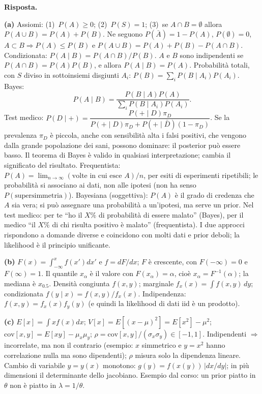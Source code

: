 \documentclass[11pt,a4paper]{article}
\newcommand{\Ris}[1]{\noindent\textbf{Risposta.}\par\nopagebreak #1}
\begin{document}
\Ris{
\textbf{(a)} Assiomi: (1)~$P(A)\ge0$; (2)~$P(S)=1$; (3)~se $A\cap B=\emptyset$ allora $P(A\cup B)=P(A)+P(B)$. Ne seguono $P(\bar A)=1-P(A)$, $P(\emptyset)=0$, $A\subset B\Rightarrow P(A)\le P(B)$ e $P(A\cup B)=P(A)+P(B)-P(A\cap B)$.
Condizionata: $P(A\mid B)=P(A\cap B)/P(B)$. $A$ e $B$ sono indipendenti se $P(A\cap B)=P(A)P(B)$, e allora $P(A\mid B)=P(A)$.
Probabilit\`a totali, con $S$ diviso in sottoinsiemi disgiunti $A_i$: $P(B)=\sum_i P(B\mid A_i)P(A_i)$. Bayes:
\[
P(A\mid B)=\frac{P(B\mid A)P(A)}{\sum_i P(B\mid A_i)P(A_i)} .
\]
Test medico: $P(D\mid +)=\dfrac{P(+\mid D)\pi_D}{P(+\mid D)\pi_D+P(+\mid\bar D)(1-\pi_D)}$. Se la prevalenza $\pi_D$ \`e piccola, anche con sensibilit\`a alta i falsi positivi, che vengono dalla grande popolazione dei sani, possono dominare: il posterior pu\`o essere basso.
Il teorema di Bayes \`e valido in qualsiasi interpretazione; cambia il significato del risultato.
Frequentista: $P(A)=\lim_{n\to\infty}(\text{volte in cui esce }A)/n$, per esiti di esperimenti ripetibili; le probabilit\`a si associano ai dati, non alle ipotesi (non ha senso $P(\text{supersimmetria})$).
Bayesiana (soggettiva): $P(A)$ \`e il grado di credenza che $A$ sia vera; si pu\`o assegnare una probabilit\`a a un'ipotesi, ma serve un prior. Nel test medico: per te ``ho il $X\%$ di probabilit\`a di essere malato'' (Bayes), per il medico ``il $X\%$ di chi risulta positivo \`e malato'' (frequentista).
I due approcci rispondono a domande diverse e coincidono con molti dati e prior deboli; la likelihood \`e il principio unificante.

\textbf{(b)} $F(x)=\int_{-\infty}^x f(x')dx'$ e $f=dF/dx$; $F$ \`e crescente, con $F(-\infty)=0$ e $F(\infty)=1$. Il quantile $x_\alpha$ \`e il valore con $F(x_\alpha)=\alpha$, cio\`e $x_\alpha=F^{-1}(\alpha)$; la mediana \`e $x_{0.5}$.
Densit\`a congiunta $f(x,y)$; marginale $f_x(x)=\int f(x,y)\,dy$; condizionata $f(y\mid x)=f(x,y)/f_x(x)$. Indipendenza: $f(x,y)=f_x(x)f_y(y)$ (e quindi la likelihood di dati iid \`e un prodotto).

\textbf{(c)} $E[x]=\int x f(x)dx$; $V[x]=E[(x-\mu)^2]=E[x^2]-\mu^2$; $\mathrm{cov}[x,y]=E[xy]-\mu_x\mu_y$; $\rho=\mathrm{cov}[x,y]/(\sigma_x\sigma_y)\in[-1,1]$.
Indipendenti $\Rightarrow$ incorrelate, ma non il contrario (esempio: $x$ simmetrico e $y=x^2$ hanno correlazione nulla ma sono dipendenti); $\rho$ misura solo la dipendenza lineare.
Cambio di variabile $y=y(x)$ monotono: $g(y)=f(x(y))\,\bigl|dx/dy\bigr|$; in pi\`u dimensioni il determinante dello jacobiano.
Esempio dal corso: un prior piatto in $\theta$ non \`e piatto in $\lambda=1/\theta$.

}
\end{document}
